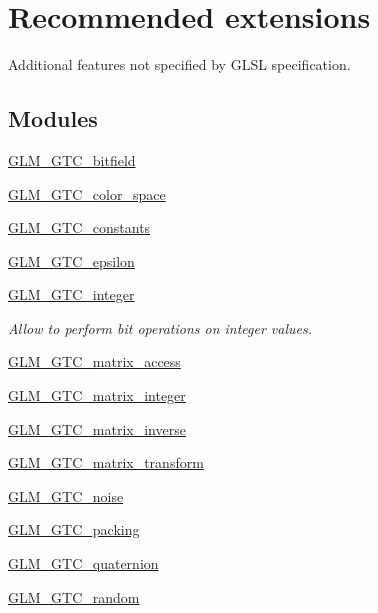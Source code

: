 \hypertarget{group__gtc}{}\section{Recommended extensions}
\label{group__gtc}


Additional features not specified by G\+L\+SL specification.  


\subsection*{Modules}
\begin{DoxyCompactItemize}
\item 
\mbox{\hyperlink{group__gtc__bitfield}{G\+L\+M\+\_\+\+G\+T\+C\+\_\+bitfield}}
\item 
\mbox{\hyperlink{group__gtc__color__space}{G\+L\+M\+\_\+\+G\+T\+C\+\_\+color\+\_\+space}}
\item 
\mbox{\hyperlink{group__gtc__constants}{G\+L\+M\+\_\+\+G\+T\+C\+\_\+constants}}
\item 
\mbox{\hyperlink{group__gtc__epsilon}{G\+L\+M\+\_\+\+G\+T\+C\+\_\+epsilon}}
\item 
\mbox{\hyperlink{group__gtc__integer}{G\+L\+M\+\_\+\+G\+T\+C\+\_\+integer}}
\begin{DoxyCompactList}\small\item\em Allow to perform bit operations on integer values. \end{DoxyCompactList}\item 
\mbox{\hyperlink{group__gtc__matrix__access}{G\+L\+M\+\_\+\+G\+T\+C\+\_\+matrix\+\_\+access}}
\item 
\mbox{\hyperlink{group__gtc__matrix__integer}{G\+L\+M\+\_\+\+G\+T\+C\+\_\+matrix\+\_\+integer}}
\item 
\mbox{\hyperlink{group__gtc__matrix__inverse}{G\+L\+M\+\_\+\+G\+T\+C\+\_\+matrix\+\_\+inverse}}
\item 
\mbox{\hyperlink{group__gtc__matrix__transform}{G\+L\+M\+\_\+\+G\+T\+C\+\_\+matrix\+\_\+transform}}
\item 
\mbox{\hyperlink{group__gtc__noise}{G\+L\+M\+\_\+\+G\+T\+C\+\_\+noise}}
\item 
\mbox{\hyperlink{group__gtc__packing}{G\+L\+M\+\_\+\+G\+T\+C\+\_\+packing}}
\item 
\mbox{\hyperlink{group__gtc__quaternion}{G\+L\+M\+\_\+\+G\+T\+C\+\_\+quaternion}}
\item 
\mbox{\hyperlink{group__gtc__random}{G\+L\+M\+\_\+\+G\+T\+C\+\_\+random}}

\end{DoxyCompactItemize}
